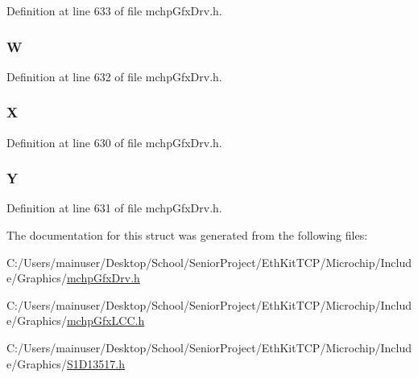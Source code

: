Definition at line 633 of file mchp\+Gfx\+Drv.\+h.

\hypertarget{struct_rectangle_area_a24c45f6de6f03ce6e2e53d0d40d40fb7}{}
\subsubsection[{W}]{ W}\label{struct_rectangle_area_a24c45f6de6f03ce6e2e53d0d40d40fb7}


Definition at line 632 of file mchp\+Gfx\+Drv.\+h.

\hypertarget{struct_rectangle_area_a7b0996e32ac615aee22f3b895d45f5c8}{}
\subsubsection[{X}]{ X}\label{struct_rectangle_area_a7b0996e32ac615aee22f3b895d45f5c8}


Definition at line 630 of file mchp\+Gfx\+Drv.\+h.

\hypertarget{struct_rectangle_area_ad83f3cd64de290d13d00032f988ac2c4}{}
\subsubsection[{Y}]{ Y}\label{struct_rectangle_area_ad83f3cd64de290d13d00032f988ac2c4}


Definition at line 631 of file mchp\+Gfx\+Drv.\+h.



The documentation for this struct was generated from the following files\+:\begin{DoxyCompactItemize}
\item 
C\+:/\+Users/mainuser/\+Desktop/\+School/\+Senior\+Project/\+Eth\+Kit\+T\+C\+P/\+Microchip/\+Include/\+Graphics/\hyperlink{mchp_gfx_drv_8h}{mchp\+Gfx\+Drv.\+h}\item 
C\+:/\+Users/mainuser/\+Desktop/\+School/\+Senior\+Project/\+Eth\+Kit\+T\+C\+P/\+Microchip/\+Include/\+Graphics/\hyperlink{mchp_gfx_l_c_c_8h}{mchp\+Gfx\+L\+C\+C.\+h}\item 
C\+:/\+Users/mainuser/\+Desktop/\+School/\+Senior\+Project/\+Eth\+Kit\+T\+C\+P/\+Microchip/\+Include/\+Graphics/\hyperlink{_s1_d13517_8h}{S1\+D13517.\+h}\end{DoxyCompactItemize}
